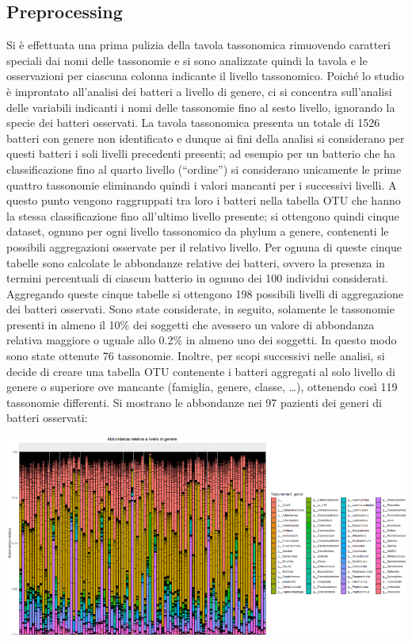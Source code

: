 \subsection{Preprocessing}
Si è effettuata una prima pulizia della tavola tassonomica rimuovendo caratteri speciali dai nomi delle tassonomie e si sono analizzate quindi la tavola e le osservazioni per ciascuna colonna indicante il livello tassonomico. Poiché lo studio\cite{paper} è improntato all’analisi dei batteri a livello di genere, ci si concentra sull’analisi delle variabili indicanti i nomi delle tassonomie fino al sesto livello, ignorando la specie dei batteri osservati. La tavola tassonomica presenta un totale di 1526 batteri con genere non identificato e dunque ai fini della analisi si considerano per questi batteri i soli livelli precedenti presenti; ad esempio per un batterio che ha classificazione fino al quarto livello (“ordine”) si considerano unicamente le prime quattro tassonomie eliminando quindi i valori mancanti per i successivi livelli. A questo punto vengono raggruppati tra loro i batteri nella tabella OTU che hanno la stessa classificazione fino all’ultimo livello presente; si ottengono quindi cinque dataset, ognuno per ogni livello tassonomico da phylum a genere, contenenti le possibili aggregazioni osservate per il relativo livello. Per ognuna di queste cinque tabelle sono calcolate le abbondanze relative dei batteri, ovvero la presenza in termini percentuali di ciascun batterio in ognuno dei 100 individui considerati. Aggregando queste cinque tabelle si ottengono 198 possibili livelli di aggregazione dei batteri osservati. Sono state considerate, in seguito, solamente le tassonomie presenti in almeno il 10\% dei soggetti che avessero un valore di abbondanza relativa maggiore o uguale allo 0.2\% in almeno uno dei soggetti. In questo modo sono state ottenute 76 tassonomie.
Inoltre, per scopi successivi nelle analisi, si decide di creare una tabella OTU contenente i batteri aggregati al solo livello di genere o superiore ove mancante (famiglia, genere, classe, …), ottenendo così 119 tassonomie differenti. 
Si mostrano le abbondanze nei 97 pazienti dei generi di batteri osservati:


\vspace*{1cm}
\begin{Figure}
    \centering
    \includegraphics[width=\linewidth,keepaspectratio]{images/abbondanza-generi.png}
  \end{Figure}
 \vspace*{1cm}  

